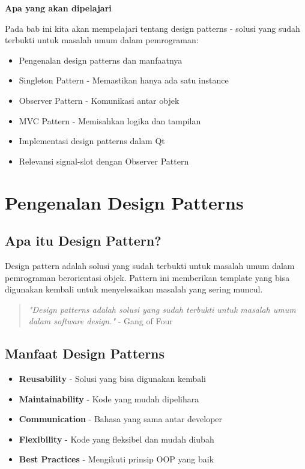 \textbf{Apa yang akan dipelajari}

Pada bab ini kita akan mempelajari tentang design patterns - solusi yang sudah terbukti untuk masalah umum dalam pemrograman:

\begin{itemize}
\item Pengenalan design patterns dan manfaatnya
\item Singleton Pattern - Memastikan hanya ada satu instance
\item Observer Pattern - Komunikasi antar objek
\item MVC Pattern - Memisahkan logika dan tampilan
\item Implementasi design patterns dalam Qt
\item Relevansi signal-slot dengan Observer Pattern
\end{itemize}

\minitoc

\section{Pengenalan Design Patterns}

\subsection{Apa itu Design Pattern?}

Design pattern adalah solusi yang sudah terbukti untuk masalah umum dalam pemrograman berorientasi objek. Pattern ini memberikan template yang bisa digunakan kembali untuk menyelesaikan masalah yang sering muncul.

\begin{quote}
\textit{"Design patterns adalah solusi yang sudah terbukti untuk masalah umum dalam software design."} - Gang of Four
\end{quote}

\subsection{Manfaat Design Patterns}

\begin{itemize}
\item \textbf{Reusability} - Solusi yang bisa digunakan kembali
\item \textbf{Maintainability} - Kode yang mudah dipelihara
\item \textbf{Communication} - Bahasa yang sama antar developer
\item \textbf{Flexibility} - Kode yang fleksibel dan mudah diubah
\item \textbf{Best Practices} - Mengikuti prinsip OOP yang baik
\end{itemize}

